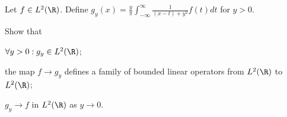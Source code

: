 Let $f\in L^2(\R)$. Define
$g_y(x)=\frac{y}{\pi}\int_{-\infty}^{\infty}\frac{1}{(x-t)+y^2}f(t)dt$
for $y>0$.

Show that
\begin{alist}
\item $\forall y>0:g_y\in L^2(\R)$;
\item the map $f\rightarrow g_y$ defines a family of bounded linear
operators from $L^2(\R)$ to $L^2(\R)$;
\item $g_y\rightarrow f$ in $L^2(\R)$ as $y\rightarrow 0$. 
\end{alist}
